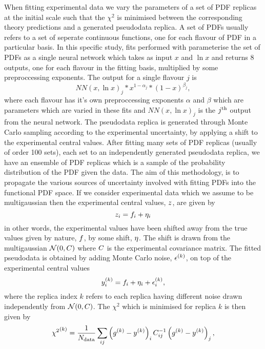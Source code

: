 When fitting experimental data we vary the parameters of a set of PDF replicas at
the initial scale such that the $\chi^2$ is minimised between the corresponding theory
predictions and a generated pseudodata replica. A set of PDFs usually refers to a set of
seperate continuous functions, one for each flavour of PDF in a particular basis.
In this specific study, fits performed with \nfit parameterise the set of PDFs
as a single neural network which takes as input $x$ and $\ln x$ and returns
8 outputs, one for each flavour in the fitting basis, multiplied by some
preproccessing exponents. The output for a single flavour $j$ is
\begin{equation}
    NN(x, \ln x)_j * x^{1-\alpha_j} * (1-x)^{\beta_j},
\end{equation}
where each flavour has it's own preproccessing exponents $\alpha$ and $\beta$
which are parameters which are varied in these fits and $NN(x, \ln x)_j$ is the
$j^{\rm th}$ output from the neural network. The pseudodata replica is generated
through Monte Carlo sampling according to the experimental uncertainty, by
applying a shift to the experimental
central values. After fitting many sets of PDF replicas (usually of order 100 sets),
each set to an independently generated pseudodata replica, we have an ensemble of
PDF replicas which is a sample of the probability distribution of the PDF given
the data. The aim of this methodology, is to propagate the various sources of
uncertainty involved with fitting PDFs into the functional PDF space. If we
consider experimental data which we assume
to be multigaussian then the experimental central values, $z$, are given by
\begin{equation}
    z_{i} = f_i + \eta_i
\end{equation}
in other words, the experimental values have been shifted away from the true
values given by nature, $f$, by some shift, $\eta$. The shift is drawn from
the multigaussian $\mathcal{N}(0, C)$ where $C$ is the experimental covariance
matrix. The fitted pseudodata is obtained by adding Monte Carlo noise, $\epsilon^{(k)}$,
on top of the experimental central values
\begin{equation}
    y^{(k)}_{i} = f_i + \eta_i + \epsilon^{(k)}_{i},
\end{equation}
where the replica index $k$ refers to each replica having different noise drawn
independently from $\mathcal{N}(0, C)$. The $\chi^2$ which is minimised for
replica $k$ is then given by
\begin{equation}
    {\chi^2}^{(k)} = \frac{1}{N_{\rm data}} \sum_{ij} \left( g^{(k)} - y^{(k)} \right)_i C^{-1}_{ij} \left( g^{(k)} - y^{(k)} \right)_j,
\end{equation}
